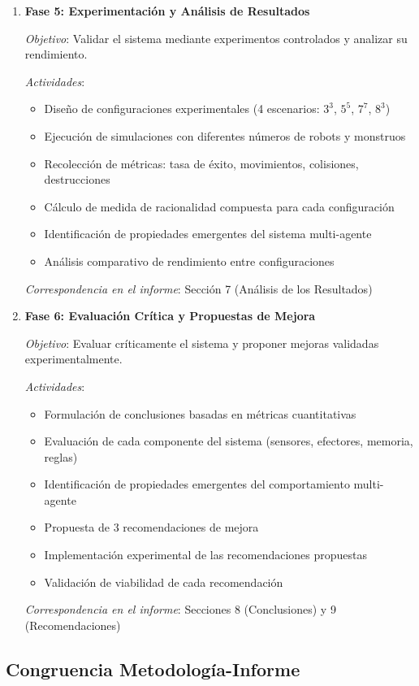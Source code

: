 \documentclass[10pt,twocolumn]{article}
\begin{document}
\begin{enumerate}
\item \textbf{Fase 5: Experimentación y Análisis de Resultados}

\textit{Objetivo}: Validar el sistema mediante experimentos controlados y analizar su rendimiento.

\textit{Actividades}:
\begin{itemize}
\item Diseño de configuraciones experimentales (4 escenarios: $3^3$, $5^5$, $7^7$, $8^3$)
\item Ejecución de simulaciones con diferentes números de robots y monstruos
\item Recolección de métricas: tasa de éxito, movimientos, colisiones, destrucciones
\item Cálculo de medida de racionalidad compuesta para cada configuración
\item Identificación de propiedades emergentes del sistema multi-agente
\item Análisis comparativo de rendimiento entre configuraciones
\end{itemize}

\textit{Correspondencia en el informe}: Sección 7 (Análisis de los Resultados)

\item \textbf{Fase 6: Evaluación Crítica y Propuestas de Mejora}

\textit{Objetivo}: Evaluar críticamente el sistema y proponer mejoras validadas experimentalmente.

\textit{Actividades}:
\begin{itemize}
\item Formulación de conclusiones basadas en métricas cuantitativas
\item Evaluación de cada componente del sistema (sensores, efectores, memoria, reglas)
\item Identificación de propiedades emergentes del comportamiento multi-agente
\item Propuesta de 3 recomendaciones de mejora
\item Implementación experimental de las recomendaciones propuestas
\item Validación de viabilidad de cada recomendación
\end{itemize}

\textit{Correspondencia en el informe}: Secciones 8 (Conclusiones) y 9 (Recomendaciones)
\end{enumerate}

\subsection{Congruencia Metodología-Informe}
\end{document}
